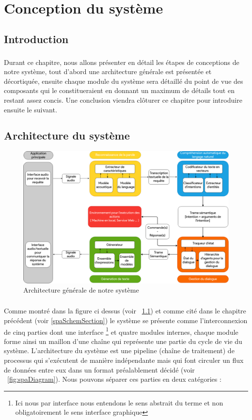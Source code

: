 \chapter{Conception du système}

\section{Introduction}
\paragraph{}
Durant ce chapitre, nous allons présenter en détail les étapes de conceptions de notre système, tout d'abord une architecture générale est présentée et décortiquée, ensuite chaque module du système sera détaillé du point de vue des composants qui le constitueraient en donnant un maximum de détails tout en restant assez concis. Une conclusion viendra clôturer ce chapitre pour introduire ensuite le suivant.
\section{Architecture du système}
\begin{figure}[H]
	\centering
	\includegraphics[width=0.85\linewidth]{images/SPA_architecture.png}
	\caption{Architecture générale de notre système}
	\label{spaArch}
\end{figure}
\paragraph{}
Comme montré dans la figure ci dessus (voir ~\ref{spaArch}) et comme cité dans le chapitre précédent (voir \ref{spaSchemSection}) le système se présente comme l'interconnexion de cinq parties dont une interface \footnote{Ici nous par interface nous entendons le sens abstrait du terme et non obligatoirement le sens interface graphique} et quatre modules internes, chaque module forme ainsi un maillon d'une chaîne qui représente une partie du cycle de vie du système. L'architecture du système est une pipeline (chaîne de traitement) de processus qui s'exécutent de manière indépendante mais qui font circuler un flux de données entre eux dans un format préalablement décidé (voir ~\ref{fig:spaDiagram}). Nous pouvons séparer ces parties en deux catégories :
